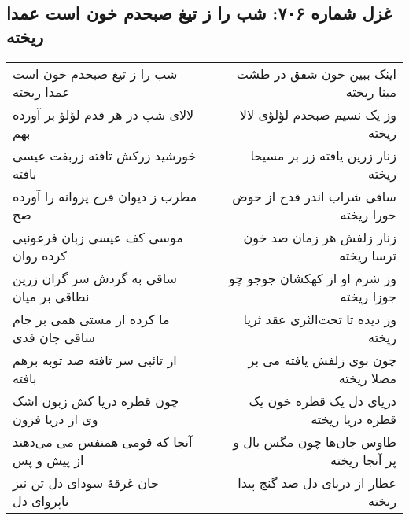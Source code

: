 \begin{center}
\section*{غزل شماره ۷۰۶: شب را ز تیغ صبحدم خون است عمدا ریخته}
\label{sec:706}
\begin{longtable}{l p{0.5cm} r}
شب را ز تیغ صبحدم خون است عمدا ریخته
&&
اینک ببین خون شفق در طشت مینا ریخته
\\
لالای شب در هر قدم لؤلؤ بر آورده بهم
&&
وز یک نسیم صبحدم لؤلؤی لالا ریخته
\\
خورشید زرکش تافته زربفت عیسی بافته
&&
زنار زرین یافته زر بر مسیحا ریخته
\\
مطرب ز دیوان فرح پروانه را آورده صح
&&
ساقی شراب اندر قدح از حوض حورا ریخته
\\
موسی کف عیسی زبان فرعونیی کرده روان
&&
زنار زلفش هر زمان صد خون ترسا ریخته
\\
ساقی به گردش سر گران زرین نطاقی بر میان
&&
وز شرم او از کهکشان جوجو چو جوزا ریخته
\\
ما کرده از مستی همی بر جام ساقی جان فدی
&&
وز دیده تا تحت‌الثری عقد ثریا ریخته
\\
از تائبی سر تافته صد توبه برهم بافته
&&
چون بوی زلفش یافته می بر مصلا ریخته
\\
چون قطره دریا کش زبون اشک وی از دریا فزون
&&
دریای دل یک قطره خون یک قطره دریا ریخته
\\
آنجا که قومی همنفس می می‌دهند از پیش و پس
&&
طاوس جان‌ها چون مگس بال و پر آنجا ریخته
\\
جان غرقهٔ سودای دل تن نیز ناپروای دل
&&
عطار از دریای دل صد گنج پیدا ریخته
\\
\end{longtable}
\end{center}
